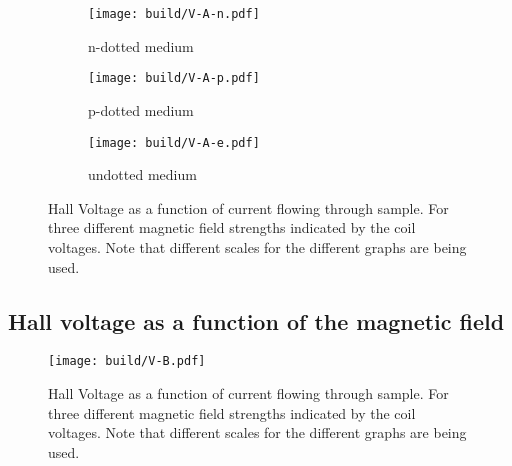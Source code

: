 \begin{figure}
     \centering
     \begin{subfigure}[b]{0.4\textwidth}
         \centering
         \texttt{[image: build/V-A-n.pdf]}
         \caption{n-dotted medium}
         \label{fig:a-n}
     \end{subfigure}
     \hfill
     \begin{subfigure}[b]{0.4\textwidth}
         \centering
         \texttt{[image: build/V-A-p.pdf]}
         \caption{p-dotted medium}
         \label{fig:a-p}
     \end{subfigure}
     \hfill
     \begin{subfigure}[b]{0.4\textwidth}
         \centering
         \texttt{[image: build/V-A-e.pdf]}
         \caption{undotted medium}
         \label{fig:a-e}
     \end{subfigure}
        \caption{Hall Voltage as a function of current flowing through sample. For three different
        magnetic field strengths indicated by the coil voltages. Note that different scales for the
      different graphs are being used.}
        \label{fig:res-a}
\end{figure}

\subsection{Hall voltage as a function of the magnetic field}
\label{sec:res-b}

\begin{figure}
     \centering
         \texttt{[image: build/V-B.pdf]}
        \caption{Hall Voltage as a function of current flowing through sample. For three different
        magnetic field strengths indicated by the coil voltages. Note that different scales for the
      different graphs are being used.}
        \label{fig:res-b}
\end{figure}
